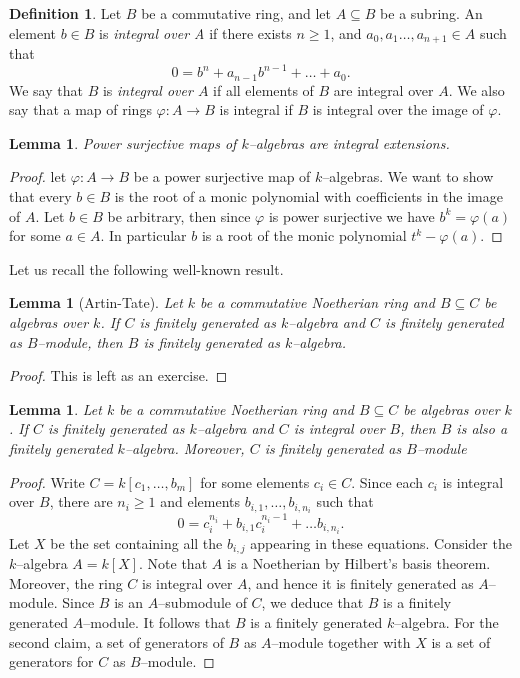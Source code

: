 \documentclass{article}
\theoremstyle{plain}
\newtheorem{Lemma}[Th]{Lemma}
\theoremstyle{definition}
\newtheorem{Def}[Th]{Definition}
\begin{document}
\begin{Def}
  Let $B$ be a commutative ring, and let $A\subseteq B$ be a subring. An element $b\in B$ is \textit{integral over A} if there exists $n\geq 1$, and  $a_0,a_1\ldots, a_{n+1}\in A$ such that 
  \[
   0 = b^n +a_{n-1}b^{n-1} + \ldots +a_0. 
  \]
  We say that $B$ is \textit{integral over $A$} if all elements of $B$ are integral over $A$. We also say that a map of rings $\varphi\colon A\to B$ is integral if $B$ is integral over the image of $\varphi$. 
\end{Def}


\begin{Lemma}\label{integral1}
    Power surjective maps of $k$--algebras are integral extensions.
\end{Lemma}

\begin{proof}
    let $\varphi:A
    \to B$ be a power surjective map of $k$--algebras. We want to show that every $b\in B$ is the root of a monic polynomial with coefficients in the image of $A$. Let $b\in B$ be arbitrary, then since $\varphi$ is power surjective we have $b^k=\varphi(a)$ for some $a\in A$. In particular $b$ is a root of the monic polynomial $t^k-\varphi(a)$.
\end{proof}

Let us recall the following well-known result. 

\begin{Lemma}[Artin-Tate]
    Let $k$ be a commutative Noetherian ring and $B\subseteq C$ be algebras over $k$. If $C$ is finitely generated as $k$--algebra and $C$ is finitely generated as $B$--module, then $B$ is finitely generated as $k$--algebra. 
\end{Lemma}

\begin{proof}
    This is left as an exercise. 
\end{proof}

\begin{Lemma}\label{Lemma Artin-Tate}
   Let $k$ be a commutative Noetherian ring and $B\subseteq C$ be algebras over $k$. If $C$ is finitely generated as $k$--algebra and $C$ is integral over $B$, then  $B$ is also a finitely generated $k$--algebra. Moreover, $C$ is finitely generated as $B$--module 
\end{Lemma}

\begin{proof}
    Write $C=k[c_1,\ldots,b_m]$ for some elements $c_i\in C$. Since each  $c_i$ is integral over $B$, there are $n_i\geq 1$ and elements $b_{i,1},\ldots , b_{i,n_i}$ such that 
    \[
    0=c_i^{n_i} + b_{i,1}c_i^{n_i-1}+\ldots b_{i,n_i}.
    \]
    Let $X$ be the set containing all the  $b_{i,j}$ appearing in these equations. Consider the $k$--algebra $A=k[X]$. Note that $A$ is a Noetherian by Hilbert's basis theorem. Moreover, the ring $C$ is integral over $A$, and hence it  is finitely generated as $A$--module. Since $B$ is an $A$--submodule of $C$, we deduce that $B$ is a finitely generated $A$--module. It follows that $B$ is a finitely generated $k$--algebra.  For the second claim, a set of generators of $B$ as $A$--module together with $X$ is a set of generators for $C$ as $B$--module. 
\end{proof}
\end{document}
